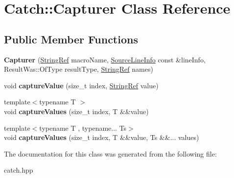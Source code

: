 \hypertarget{classCatch_1_1Capturer}{}\section{Catch\+:\+:Capturer Class Reference}
\label{classCatch_1_1Capturer}
\subsection*{Public Member Functions}
\begin{DoxyCompactItemize}
\item 
\mbox{\label{classCatch_1_1Capturer_a86b0b27acc803a4e1310c10820f3038f}} 
{\bfseries Capturer} (\hyperlink{classCatch_1_1StringRef}{String\+Ref} macro\+Name, \hyperlink{structCatch_1_1SourceLineInfo}{Source\+Line\+Info} const \&line\+Info, Result\+Was\+::\+Of\+Type result\+Type, \hyperlink{classCatch_1_1StringRef}{String\+Ref} names)
\item 
\mbox{\label{classCatch_1_1Capturer_a45e14b9667dc9df7f5132507b322934c}} 
void {\bfseries capture\+Value} (size\+\_\+t index, \hyperlink{classCatch_1_1StringRef}{String\+Ref} value)
\item 
\mbox{\label{classCatch_1_1Capturer_af0810e7f79b197648434d81b492a8c2b}} 
{\footnotesize template$<$typename T $>$ }\\void {\bfseries capture\+Values} (size\+\_\+t index, T \&\&value)
\item 
\mbox{\label{classCatch_1_1Capturer_a152c9083bfed800786673327b9c522ce}} 
{\footnotesize template$<$typename T , typename... Ts$>$ }\\void {\bfseries capture\+Values} (size\+\_\+t index, T \&\&value, Ts \&\&... values)
\end{DoxyCompactItemize}


The documentation for this class was generated from the following file\+:\begin{DoxyCompactItemize}
\item 
catch.\+hpp\end{DoxyCompactItemize}
